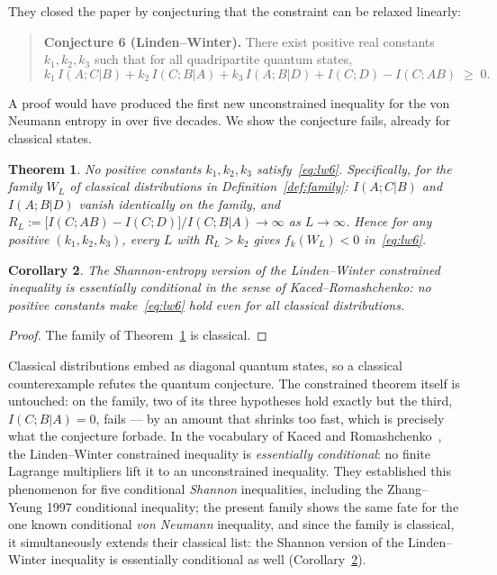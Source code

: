 \documentclass[11pt]{article}
\newtheorem{theorem}{Theorem}
\newtheorem{corollary}[theorem]{Corollary}
\theoremstyle{remark}
\newcommand{\I}{\mathrel{;}}
\begin{document}
\noindent
They closed the paper by conjecturing that the constraint can be relaxed linearly:

\begin{quote}
\textbf{Conjecture 6 (Linden--Winter).} There exist positive real constants
$k_1,k_2,k_3$ such that for all quadripartite quantum states,
\begin{equation}\label{eq:lw6}
k_1\, I(A\I C|B) + k_2\, I(C\I B|A) + k_3\, I(A\I B|D) + I(C\I D) - I(C\I AB)\;\ge\;0 .
\end{equation}
\end{quote}

\noindent
A proof would have produced the first new unconstrained inequality for the von Neumann
entropy in over five decades. We show the conjecture fails, already for classical states.

\begin{theorem}\label{thm:main}
No positive constants $k_1,k_2,k_3$ satisfy~\eqref{eq:lw6}. Specifically, for the family
$W_L$ of classical distributions in Definition~\ref{def:family}: $I(A\I C|B)$ and
$I(A\I B|D)$ vanish identically on the family, and
$R_L := \bigl[I(C\I AB)-I(C\I D)\bigr]/I(C\I B|A) \longrightarrow \infty$
as $L\to\infty$. Hence for any positive $(k_1,k_2,k_3)$, every $L$ with $R_L > k_2$ gives
$f_k(W_L)<0$ in~\eqref{eq:lw6}.
\end{theorem}

\begin{corollary}\label{cor:classical}
The Shannon-entropy version of the Linden--Winter constrained inequality is essentially
conditional in the sense of Kaced--Romashchenko: no positive constants make~\eqref{eq:lw6}
hold even for all classical distributions.
\end{corollary}

\begin{proof}
The family of Theorem~\ref{thm:main} is classical.
\end{proof}

Classical distributions embed as diagonal quantum states, so a classical counterexample
refutes the quantum conjecture. The constrained theorem itself is untouched: on the
family, two of its three hypotheses hold exactly but the third,
$I(C\I B|A)=0$, fails --- by an amount that shrinks too fast, which is precisely what the
conjecture forbade. In the vocabulary of Kaced and Romashchenko~\cite{KR2013}, the
Linden--Winter constrained inequality is \emph{essentially conditional}: no finite
Lagrange multipliers lift it to an unconstrained inequality. They established this
phenomenon for five conditional \emph{Shannon} inequalities, including the Zhang--Yeung
1997 conditional inequality; the present family shows the same fate for the one known
conditional \emph{von Neumann} inequality, and since the family is classical, it
simultaneously extends their classical list: the Shannon version of the Linden--Winter
inequality is essentially conditional as well (Corollary~\ref{cor:classical}).
\end{document}
